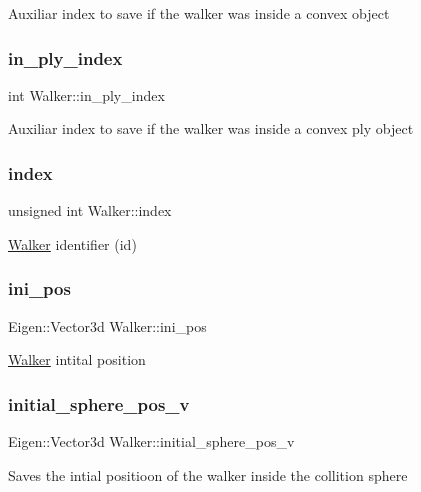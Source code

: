 Auxiliar index to save if the walker was inside a convex object \mbox{\label{class_walker_a48d0fe08f2297d9ad56cfaec9ee1926c}} 
\subsubsection{\texorpdfstring{in\+\_\+ply\+\_\+index}{in\_ply\_index}}
{\footnotesize\ttfamily int Walker\+::in\+\_\+ply\+\_\+index}

Auxiliar index to save if the walker was inside a convex ply object \mbox{\label{class_walker_a58e2d14d760748687138b7582cd04365}} 
\subsubsection{\texorpdfstring{index}{index}}
{\footnotesize\ttfamily unsigned int Walker\+::index}

\hyperlink{class_walker}{Walker} identifier (id) \mbox{\label{class_walker_a98116f0e5d65e1cf65449d80a2d87617}} 
\subsubsection{\texorpdfstring{ini\+\_\+pos}{ini\_pos}}
{\footnotesize\ttfamily Eigen\+::\+Vector3d Walker\+::ini\+\_\+pos}

\hyperlink{class_walker}{Walker} intital position \mbox{\label{class_walker_a8a27ead68d3dc7140afbec2710fb3176}} 
\subsubsection{\texorpdfstring{initial\+\_\+sphere\+\_\+pos\+\_\+v}{initial\_sphere\_pos\_v}}
{\footnotesize\ttfamily Eigen\+::\+Vector3d Walker\+::initial\+\_\+sphere\+\_\+pos\+\_\+v}

Saves the intial positioon of the walker inside the collition sphere \mbox{\label{class_walker_a8ca6c90f124e46869ea752920565e2c2}} 
